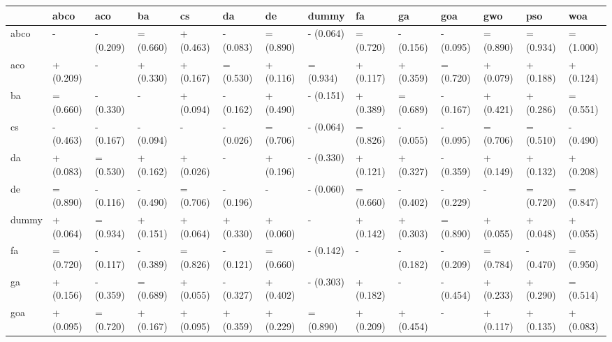 \begin{table}
    \centering
    \begin{adjustbox}{width=\linewidth}
        \begin{tabular}{llllllllllllll}
            \toprule
            {}    & abco      & aco       & ba        & cs        & da        & de        & dummy     & fa        & ga        & goa       & gwo       & pso       & woa       \\
            \midrule
            abco  & -         & - (0.209) & = (0.660) & + (0.463) & - (0.083) & = (0.890) & - (0.064) & = (0.720) & - (0.156) & - (0.095) & = (0.890) & = (0.934) & = (1.000) \\
            aco   & + (0.209) & -         & + (0.330) & + (0.167) & = (0.530) & + (0.116) & = (0.934) & + (0.117) & + (0.359) & = (0.720) & + (0.079) & + (0.188) & + (0.124) \\
            ba    & = (0.660) & - (0.330) & -         & + (0.094) & - (0.162) & + (0.490) & - (0.151) & + (0.389) & = (0.689) & - (0.167) & + (0.421) & + (0.286) & = (0.551) \\
            cs    & - (0.463) & - (0.167) & - (0.094) & -         & - (0.026) & = (0.706) & - (0.064) & = (0.826) & - (0.055) & - (0.095) & = (0.706) & = (0.510) & - (0.490) \\
            da    & + (0.083) & = (0.530) & + (0.162) & + (0.026) & -         & + (0.196) & - (0.330) & + (0.121) & + (0.327) & - (0.359) & + (0.149) & + (0.132) & + (0.208) \\
            de    & = (0.890) & - (0.116) & - (0.490) & = (0.706) & - (0.196) & -         & - (0.060) & = (0.660) & - (0.402) & - (0.229) & -         & = (0.720) & = (0.847) \\
            dummy & + (0.064) & = (0.934) & + (0.151) & + (0.064) & + (0.330) & + (0.060) & -         & + (0.142) & + (0.303) & = (0.890) & + (0.055) & + (0.048) & + (0.055) \\
            fa    & = (0.720) & - (0.117) & - (0.389) & = (0.826) & - (0.121) & = (0.660) & - (0.142) & -         & - (0.182) & - (0.209) & = (0.784) & - (0.470) & = (0.950) \\
            ga    & + (0.156) & - (0.359) & = (0.689) & + (0.055) & - (0.327) & + (0.402) & - (0.303) & + (0.182) & -         & - (0.454) & + (0.233) & + (0.290) & = (0.514) \\
            goa   & + (0.095) & = (0.720) & + (0.167) & + (0.095) & + (0.359) & + (0.229) & = (0.890) & + (0.209) & + (0.454) & -         & + (0.117) & + (0.135) & + (0.083) \\

\end{tabular}
\end{adjustbox}
\end{table}
